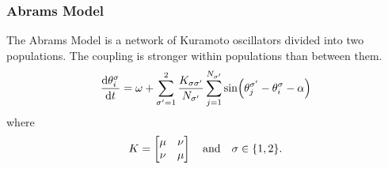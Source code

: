 \documentclass[hyperref={hidelinks}]{beamer}
\begin{document}
\begin{frame}
  \frametitle{Abrams Model}
  The Abrams Model is a network of Kuramoto oscillators divided into two populations.
  The coupling is stronger within populations than between them.
  \begin{equation}
    \label{eq:abrams}
    \dv{\theta_{i}^{\sigma}}{t}
    =
    \omega
    +
    \sum_{\sigma' = 1}^{2} \frac{K_{\sigma \sigma'}}{N_{\sigma'}} \sum_{j = 1}^{N_{\sigma'}} \sin(\theta_{j}^{\sigma'} - \theta_{i}^{\sigma} - \alpha)
  \end{equation}
  where
  \begin{equation}
    \label{eq:abrams_params}
    K
    =
    \bmqty{\mu & \nu \\ \nu & \mu}
    \qand
    \sigma \in \Bqty{1, 2}.
  \end{equation}

\end{frame}
\end{document}
